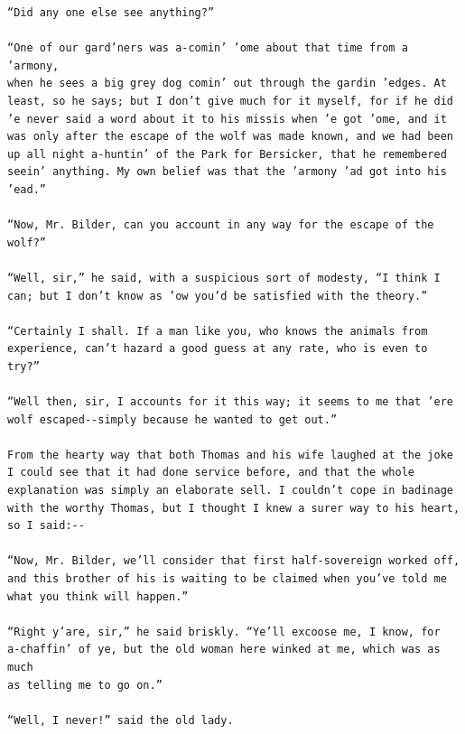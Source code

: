 \documentclass{article}
\begin{document}
\begin{verbatim}
“Did any one else see anything?”

“One of our gard’ners was a-comin’ ’ome about that time from a ’armony,
when he sees a big grey dog comin’ out through the gardin ’edges. At
least, so he says; but I don’t give much for it myself, for if he did
’e never said a word about it to his missis when ’e got ’ome, and it
was only after the escape of the wolf was made known, and we had been
up all night a-huntin’ of the Park for Bersicker, that he remembered
seein’ anything. My own belief was that the ’armony ’ad got into his
’ead.”

“Now, Mr. Bilder, can you account in any way for the escape of the
wolf?”

“Well, sir,” he said, with a suspicious sort of modesty, “I think I
can; but I don’t know as ’ow you’d be satisfied with the theory.”

“Certainly I shall. If a man like you, who knows the animals from
experience, can’t hazard a good guess at any rate, who is even to try?”

“Well then, sir, I accounts for it this way; it seems to me that ’ere
wolf escaped--simply because he wanted to get out.”

From the hearty way that both Thomas and his wife laughed at the joke
I could see that it had done service before, and that the whole
explanation was simply an elaborate sell. I couldn’t cope in badinage
with the worthy Thomas, but I thought I knew a surer way to his heart,
so I said:--

“Now, Mr. Bilder, we’ll consider that first half-sovereign worked off,
and this brother of his is waiting to be claimed when you’ve told me
what you think will happen.”

“Right y’are, sir,” he said briskly. “Ye’ll excoose me, I know, for
a-chaffin’ of ye, but the old woman here winked at me, which was as much
as telling me to go on.”

“Well, I never!” said the old lady.


\end{verbatim}
\end{document}
